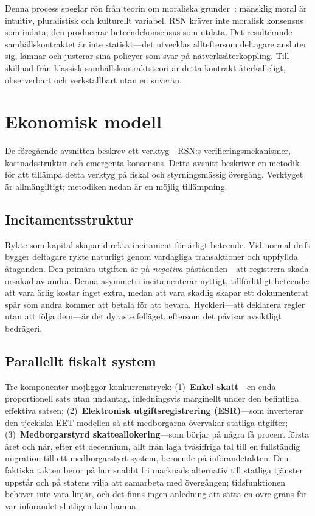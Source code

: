 \documentclass[11pt,a4paper,twocolumn]{article}
\begin{document}
Denna process speglar rön från teorin om moraliska grunder~\cite{haidt2012}: mänsklig moral är intuitiv, pluralistisk och kulturellt variabel. RSN kräver inte moralisk konsensus som indata; den producerar beteendekonsensus som utdata. Det resulterande samhällskontraktet är inte statiskt---det utvecklas allteftersom deltagare ansluter sig, lämnar och justerar sina policyer som svar på nätverksåterkoppling. Till skillnad från klassisk samhällskontraktsteori är detta kontrakt återkalleligt, observerbart och verkställbart utan en suverän.

\section{Ekonomisk modell}

De föregående avsnitten beskrev ett verktyg---RSN:s verifieringsmekanismer, kostnadsstruktur och emergenta konsensus. Detta avsnitt beskriver en metodik för att tillämpa detta verktyg på fiskal och styrningsmässig övergång. Verktyget är allmängiltigt; metodiken nedan är en möjlig tillämpning.

\subsection{Incitamentsstruktur}

Rykte som kapital skapar direkta incitament för ärligt beteende. Vid normal drift bygger deltagare rykte naturligt genom vardagliga transaktioner och uppfyllda åtaganden. Den primära utgiften är på \emph{negativa} påståenden---att registrera skada orsakad av andra. Denna asymmetri incitamenterar nyttigt, tillförlitligt beteende: att vara ärlig kostar inget extra, medan att vara skadlig skapar ett dokumenterat spår som andra kommer att betala för att bevara. Hyckleri---att deklarera regler utan att följa dem---är det dyraste felläget, eftersom det påvisar avsiktligt bedrägeri.

\subsection{Parallellt fiskalt system}

Tre komponenter möjliggör konkurrenstryck: (1)~\textbf{Enkel skatt}---en enda proportionell sats utan undantag, inledningsvis marginellt under den befintliga effektiva satsen; (2)~\textbf{Elektronisk utgiftsregistrering (ESR)}---som inverterar den tjeckiska EET-modellen så att medborgarna övervakar statliga utgifter; (3)~\textbf{Medborgarstyrd skatteallokering}---som börjar på några få procent första året och når, efter ett decennium, allt från låga tvåsiffriga tal till en fullständig migration till ett medborgarstyrt system, beroende på införandetakten. Den faktiska takten beror på hur snabbt fri marknads alternativ till statliga tjänster uppstår och på statens vilja att samarbeta med övergången; tidsfunktionen behöver inte vara linjär, och det finns ingen anledning att sätta en övre gräns för var införandet slutligen kan hamna.
\end{document}
